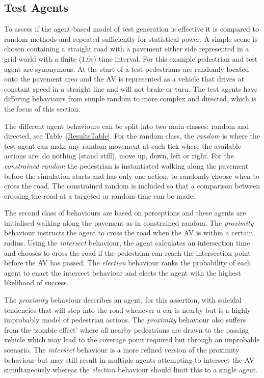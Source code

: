 \documentclass[letterpaper, 10 pt, journal, twoside]{IEEEtran}
\begin{document}
\subsection{Test Agents}
To assess if the agent-based model of test generation is effective it is compared to random methods and repeated sufficiently for statistical power. A simple scene is chosen containing a straight road with a pavement either side represented in a grid world with a finite (1.0s) time interval. For this example pedestrian and test agent are synonymous. At the start of a test pedestrians are randomly located onto the pavement area and the AV is represented as a vehicle that drives at constant speed in a straight line and will not brake or turn. The test agents have differing behaviours from simple random to more complex and directed, which is the focus of this section. 

The different agent behaviours can be split into two main classes: random and directed, see Table~\ref{ResultsTable}. For the random class, the \textit{random} is where the test agent can make any random movement at each tick where the available actions are: do nothing (stand still), move up, down, left or right. For the \textit{constrained random} the pedestrian is instantiated walking along the pavement before the simulation starts and has only one action; to randomly choose when to cross the road. The constrained random is included so that a comparison between crossing the road at a targeted or random time can be made. 

The second class of behaviours are based on perceptions and these agents are initialised walking along the pavement as in constrained random. The \textit{proximity} behaviour instructs the agent to cross the road when the AV is within a certain radius. Using the \textit{intersect} behaviour, the agent calculates an intersection time and chooses to cross the road if the pedestrian can reach the intersection point before the AV has passed. The \textit{election} behaviour ranks the probability of each agent to enact the intersect behaviour and elects the agent with the highest likelihood of success.

The \textit{proximity} behaviour describes an agent, for this assertion, with suicidal tendencies that will step into the road whenever a car is nearby but is a highly improbably model of pedestrian actions. The \textit{proximity} behaviour also suffers from the `zombie effect' where all nearby pedestrians are drawn to the passing vehicle which may lead to the coverage point required but through an improbable scenario. The \textit{intersect} behaviour is a more refined version of the proximity behaviour but may still result in multiple agents attempting to intersect the AV simultaneously whereas the \textit{election} behaviour should limit this to a single agent.
\end{document}
